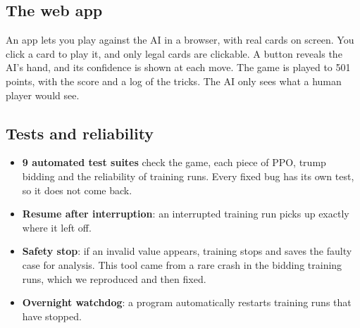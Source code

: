 \subsection*{The web app}

An app lets you play against the AI in a browser, with real cards on screen. You click a card to play it, and only legal cards are clickable. A button reveals the AI's hand, and its confidence is shown at each move. The game is played to 501 points, with the score and a log of the tricks. The AI only sees what a human player would see.

\subsection*{Tests and reliability}

\begin{itemize}

  \item \textbf{9 automated test suites} check the game, each piece of PPO, trump bidding and the reliability of training runs. Every fixed bug has its own test, so it does not come back.

  \item \textbf{Resume after interruption}: an interrupted training run picks up exactly where it left off.

  \item \textbf{Safety stop}: if an invalid value appears, training stops and saves the faulty case for analysis. This tool came from a rare crash in the bidding training runs, which we reproduced and then fixed.

  \item \textbf{Overnight watchdog}: a program automatically restarts training runs that have stopped.

\end{itemize}
